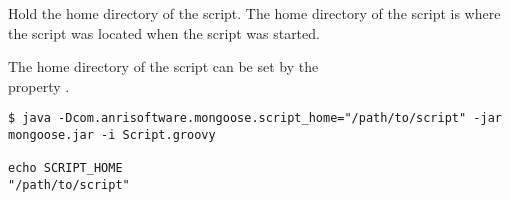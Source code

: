 %

Hold the home directory of the script. 
The home directory of the script is where the script was located when
the script was started.

The home directory of the script can be set by the \\
property .

\begin{lstlisting}[style=Groovybash, label={lst:example_variable_script_home}]
$ java -Dcom.anrisoftware.mongoose.script_home="/path/to/script" -jar mongoose.jar -i Script.groovy

echo SCRIPT_HOME
"/path/to/script"
\end{lstlisting}

